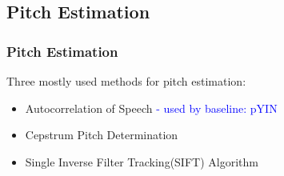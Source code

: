 \documentclass{beamer}
\begin{document}
\subsection{Pitch Estimation}
\begin{frame}
\frametitle{Pitch Estimation}

\vspace{5mm} %



Three mostly used methods for pitch estimation:\\
\begin{itemize}
\item{Autocorrelation of Speech \textcolor{blue}{- used by baseline: pYIN}}
\item{Cepstrum Pitch Determination}
\item{Single Inverse Filter Tracking(SIFT) Algorithm}
\end{itemize}
\end{frame}
\end{document}
